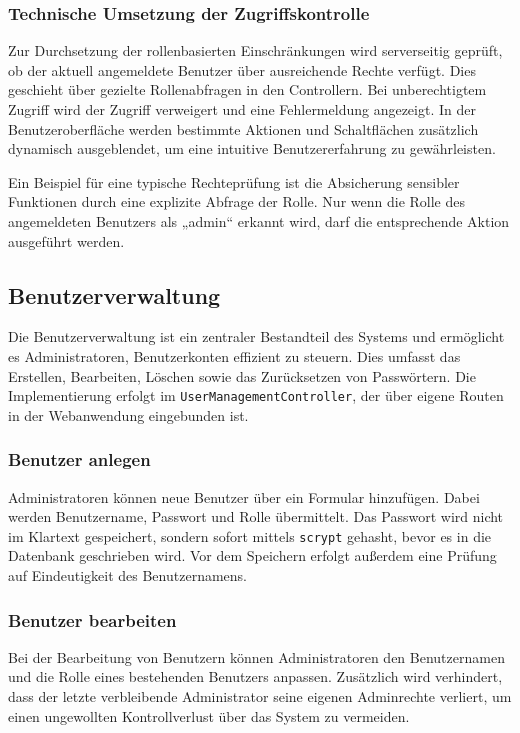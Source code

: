 \documentclass[12pt]{article}
\begin{document}
\subsubsection*{Technische Umsetzung der Zugriffskontrolle}

Zur Durchsetzung der rollenbasierten Einschränkungen wird serverseitig geprüft, ob der aktuell angemeldete Benutzer über ausreichende Rechte verfügt. Dies geschieht über gezielte Rollenabfragen in den Controllern. Bei unberechtigtem Zugriff wird der Zugriff verweigert und eine Fehlermeldung angezeigt. In der Benutzeroberfläche werden bestimmte Aktionen und Schaltflächen zusätzlich dynamisch ausgeblendet, um eine intuitive Benutzererfahrung zu gewährleisten.

\noindent Ein Beispiel für eine typische Rechteprüfung ist die Absicherung sensibler Funktionen durch eine explizite Abfrage der Rolle. Nur wenn die Rolle des angemeldeten Benutzers als „admin“ erkannt wird, darf die entsprechende Aktion ausgeführt werden.

\subsection{Benutzerverwaltung}

Die Benutzerverwaltung ist ein zentraler Bestandteil des Systems und ermöglicht es Administratoren, Benutzerkonten effizient zu steuern. Dies umfasst das Erstellen, Bearbeiten, Löschen sowie das Zurücksetzen von Passwörtern. Die Implementierung erfolgt im \texttt{UserManagementController}, der über eigene Routen in der Webanwendung eingebunden ist.

\subsubsection*{Benutzer anlegen}

Administratoren können neue Benutzer über ein Formular hinzufügen. Dabei werden Benutzername, Passwort und Rolle übermittelt. Das Passwort wird nicht im Klartext gespeichert, sondern sofort mittels \texttt{scrypt} gehasht, bevor es in die Datenbank geschrieben wird. Vor dem Speichern erfolgt außerdem eine Prüfung auf Eindeutigkeit des Benutzernamens.

\subsubsection*{Benutzer bearbeiten}

Bei der Bearbeitung von Benutzern können Administratoren den Benutzernamen und die Rolle eines bestehenden Benutzers anpassen. Zusätzlich wird verhindert, dass der letzte verbleibende Administrator seine eigenen Adminrechte verliert, um einen ungewollten Kontrollverlust über das System zu vermeiden.
\end{document}
